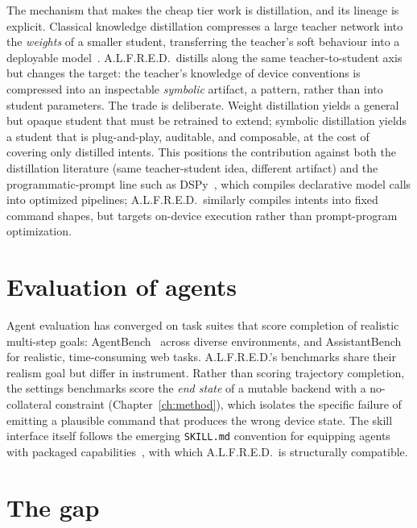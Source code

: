 The mechanism that makes the cheap tier work is distillation, and its lineage is
explicit. Classical knowledge distillation compresses a large teacher network into
the \emph{weights} of a smaller student, transferring the teacher's soft behaviour
into a deployable model~\citep{hinton2015distilling}. A.L.F.R.E.D.\ distills along
the same teacher-to-student axis but changes the target: the teacher's knowledge of
device conventions is compressed into an inspectable \emph{symbolic} artifact, a
pattern, rather than into student parameters. The trade is deliberate. Weight
distillation yields a general but opaque student that must be retrained to extend;
symbolic distillation yields a student that is plug-and-play, auditable, and
composable, at the cost of covering only distilled intents. This positions the
contribution against both the distillation literature (same teacher-student idea,
different artifact) and the programmatic-prompt line such as
DSPy~\citep{khattab2024dspy}, which compiles declarative model calls into optimized
pipelines; A.L.F.R.E.D.\ similarly compiles intents into fixed command shapes, but
targets on-device execution rather than prompt-program optimization.

\section{Evaluation of agents}
\label{sec:bg-eval}

Agent evaluation has converged on task suites that score completion of realistic
multi-step goals: AgentBench~\citep{liu2023agentbench} across diverse environments,
and AssistantBench~\citep{yoran2024assistantbench} for realistic, time-consuming
web tasks. A.L.F.R.E.D.'s benchmarks share their realism goal but differ in
instrument. Rather than scoring trajectory completion, the settings benchmarks
score the \emph{end state} of a mutable backend with a no-collateral constraint
(Chapter~\ref{ch:method}), which isolates the specific failure of emitting a
plausible command that produces the wrong device state. The skill interface itself
follows the emerging \texttt{SKILL.md} convention for equipping agents with
packaged capabilities~\citep{anthropic2025skills}, with which A.L.F.R.E.D.\ is
structurally compatible.

\section{The gap}
\label{sec:bg-gap}

